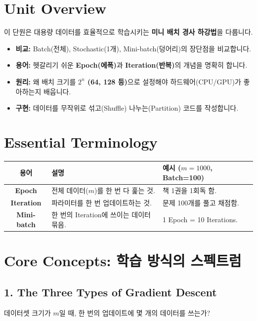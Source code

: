 \documentclass[11pt,a4paper]{book}
\theoremstyle{definition}
\begin{document}
\section{Unit Overview}
\begin{summarybox}[title={핵심 목표}]
이 단원은 대용량 데이터를 효율적으로 학습시키는 \textbf{미니 배치 경사 하강법}을 다룹니다.
\begin{itemize}
    \item \textbf{비교:} Batch(전체), Stochastic(1개), Mini-batch(덩어리)의 장단점을 비교합니다.
    \item \textbf{용어:} 헷갈리기 쉬운 \textbf{Epoch(에폭)}과 \textbf{Iteration(반복)}의 개념을 명확히 합니다.
    \item \textbf{원리:} 왜 배치 크기를 \textbf{$2^n$ (64, 128 등)}으로 설정해야 하드웨어(CPU/GPU)가 좋아하는지 배웁니다.
    \item \textbf{구현:} 데이터를 무작위로 섞고(Shuffle) 나누는(Partition) 코드를 작성합니다.
\end{itemize}
\end{summarybox}

\section{Essential Terminology}
\begin{center}
\begin{tabular}{|c|l|l|}
\hline
\textbf{용어} & \textbf{설명} & \textbf{예시 ($m=1000$, Batch=100)} \\ \hline
\textbf{Epoch} & 전체 데이터($m$)를 한 번 다 훑는 것. & 책 1권을 1회독 함. \\ \hline
\textbf{Iteration} & 파라미터를 한 번 업데이트하는 것. & 문제 100개를 풀고 채점함. \\ \hline
\textbf{Mini-batch} & 한 번의 Iteration에 쓰이는 데이터 묶음. & 1 Epoch = 10 Iterations. \\ \hline
\end{tabular}
\end{center}

\section{Core Concepts: 학습 방식의 스펙트럼}

\subsection{1. The Three Types of Gradient Descent}
데이터셋 크기가 $m$일 때, 한 번의 업데이트에 몇 개의 데이터를 쓰는가?
\end{document}
